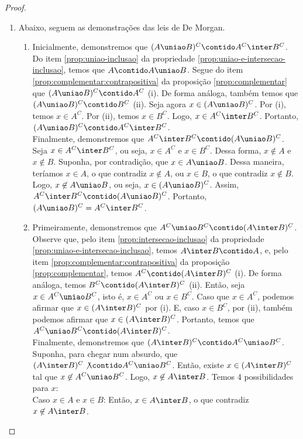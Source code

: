 \begin{proof}
\begin{enumerate}
        \item Abaixo, seguem as demonstrações das leis de De Morgan.
            \begin{enumerate}
                \item
                    Inicialmente, demonstremos que $(A \uniao B)^C \contido A^C \inter B^C$. Do item \ref{prop:uniao-inclusao} da propriedade \ref{prop:uniao-e-intersecao-inclusao}, temos que $A \contido A \uniao B$. Segue do item \ref{prop:complementar:contrapositiva} da proposição \ref{prop:complementar} que $(A \uniao B)^C \contido A^C$ (i). De forma análoga, também temos que $(A \uniao B)^C \contido B^C$ (ii). Seja agora $x \in (A \uniao B)^C$. Por (i), temos $x \in A^C$. Por (ii), temos $x \in B^C$. Logo, $x \in A^C \inter B^C$. Portanto, $(A \uniao B)^C \contido A^C \inter B^C$. \\
                    Finalmente, demonstremos que $A^C \inter B^C \contido (A \uniao B)^C$. Seja $x \in A^C \inter B^C$, ou seja, $x \in A^C$ e $x \in B^C$. Dessa forma, $x \not\in A$ e $x \not\in B$. Suponha, por contradição, que $x \in A \uniao B$. Dessa maneira, teríamos $x \in A$, o que contradiz $x \not\in A$, ou $x \in B$, o que contradiz $x \not\in B$. Logo, $x \not\in A \uniao B$, ou seja, $x \in (A \uniao B)^C$. Assim, $A^C \inter B^C \contido (A \uniao B)^C$. Portanto, $(A \uniao B)^C = A^C \inter B^C$.
                \item
                    Primeiramente, demonstremos que $A^C \uniao B^C \contido (A \inter B)^C$. Observe que, pelo item \ref{prop:intersecao-inclusao} da propriedade \ref{prop:uniao-e-intersecao-inclusao}, temos $A \inter B \contido A$, e, pelo item \ref{prop:complementar:contrapositiva} da proposição \ref{prop:complementar}, temos $A^C \contido (A \inter B)^C$ (i). De forma análoga, temos $B^C \contido (A \inter B)^C$ (ii). Então, seja $x \in A^C \uniao B^C$, isto é, $x \in A^C$ ou $x \in B^C$. Caso que $x \in A^C$, podemos afirmar que $x \in (A \inter B)^C$ por (i). E, caso $x \in B^C $, por (ii), também podemos afirmar que $x \in (A \inter B)^C$. Portanto, temos que $A^C \uniao B^C \contido (A \inter B)^C$. \\
                    Finalmente, demonstremos que $(A \inter B)^C \contido A^C \uniao B^C$. Suponha, para chegar num absurdo, que $(A \inter B)^C \not\contido A^C \uniao B^C$. Então, existe $x \in (A \inter B)^C$ tal que $x \not\in A^C \uniao B^C$. Logo, $x \not\in A \inter B$. Temos 4 possibilidades para $x$: \\
                    Caso $x \in A$ e $x \in B$: Então, $x \in A \inter B$, o que contradiz $x \not\in A \inter B$. \\

\end{enumerate}
\end{enumerate}
\end{proof}
